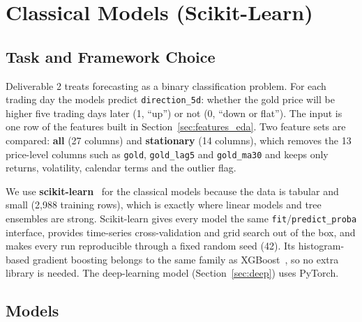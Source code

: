 \section{Classical Models (Scikit-Learn)}
\label{sec:classical}

\subsection{Task and Framework Choice}

Deliverable 2 treats forecasting as a binary classification problem. For each
trading day the models predict \texttt{direction\_5d}: whether the gold price
will be higher five trading days later (1, ``up'') or not (0, ``down or
flat''). The input is one row of the features built in
Section~\ref{sec:features_eda}. Two feature sets are compared:
\textbf{all} (27 columns) and \textbf{stationary} (14 columns), which removes the
13 price-level columns such as \texttt{gold}, \texttt{gold\_lag5} and
\texttt{gold\_ma30} and keeps only returns, volatility, calendar terms and the
outlier flag.

We use \textbf{scikit-learn}~\cite{a_pedregosa2011} for the classical models
because the data is tabular and small (2,988 training rows), which is exactly
where linear models and tree ensembles are strong. Scikit-learn gives every
model the same \texttt{fit}/\texttt{predict\_proba} interface, provides
time-series cross-validation and grid search out of the box, and makes every
run reproducible through a fixed random seed (42). Its histogram-based gradient
boosting belongs to the same family as XGBoost~\cite{a_chen2016}, so no extra
library is needed. The deep-learning model (Section~\ref{sec:deep}) uses
PyTorch.

\subsection{Models}


